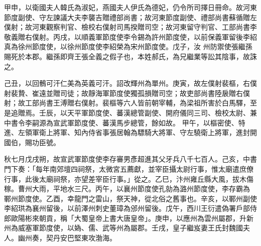 \begin{pinyinscope}
甲申，以衛國夫人韓氏為淑妃，燕國夫人伊氏為德妃，仍令所司擇日冊命。故河東節度副使、守左諫議大夫李襲吉贈禮部尚書；故河東節度副使、禮部尚書蘇循贈左僕射；故河東觀察判官、檢校右僕射司馬揆贈司空；故河東留守判官、工部尚書李敬義贈右僕射。丙戌，以順義軍節度使李令錫為許州節度使，以前保義軍留後李紹真為徐州節度使，以徐州節度使李紹榮為宋州節度使。戊子，汝
 州防禦使張繼孫賜死於本郡。繼孫即齊王張全義之假子也，本姓郝氏，為兄繼業等訟其陰事，故誅之。



 己丑，以回鶻可汗仁美為英義可汗。詔改輝州為單州。庚寅，故左僕射裴樞，右僕射裴贄、崔遠並贈司徒；故靜海軍節度使獨孤損贈司空；故吏部尚書陸扆贈右僕射；故工部尚書王溥贈右僕射。裴樞等六人皆前朝宰輔，為梁祖所害於白馬驛，至是追贈焉。壬辰，以天平軍節度使、蕃漢總管副使、開府儀同三司、檢校太尉、兼中書令李嗣源為宣武軍節度使、蕃漢馬步總管，餘如故。
 甲午，以樞密使、特進、左領軍衛上將軍、知內侍省事張居翰為驃騎大將軍、守左驍衛上將軍，進封開國伯，賜功臣號。



 秋七月戊戌朔，故宣武軍節度使李存審男彥超進其父牙兵八千七百人。己亥，中書門下奏：「每年南郊壇四祠祭，太微宮五薦獻，並宰臣攝太尉行事，惟太廟遣庶僚行事，此後太廟祠祭，亦望差宰臣行事。」從之。乙巳，汴州雍丘縣大風，拔木傷稼。曹州大雨，平地水三尺。丙午，以襄州節度使孔勍為潞州節度使，李存霸為
 鄆州節度使。乙酉，幸龍門之雷山，祭天神，從北俗之舊事也。辛亥，以鄆州副使李紹珙為襄州留後，以前澤州刺史董璋為邠州留後。戊午，西川王衍遣偽署戶部侍郎歐陽彬來朝貢，稱「大蜀皇帝上書大唐皇帝」。庚申，以應州為雲州屬郡，升新州為威塞軍節度使，以媯、儒、武等州為屬郡。壬戌，皇子繼岌妻王氏封魏國夫人。幽州奏，契丹安巴堅東攻渤海。



\end{pinyinscope}
